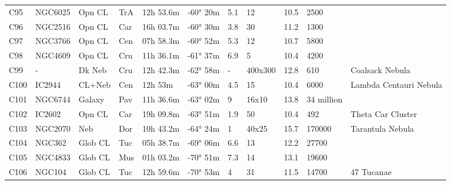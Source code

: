 \begin{table}[h]
\begin{tabular}{@{}lllllllllll@{}}
C95        & NGC6025     & Opn CL     & TrA       & 12h 53.6m & -60° 20m  & 5.1       & 12                   & 10.5     & 2500                &                                 \\
C96        & NGC2516     & Opn CL     & Car       & 16h 03.7m & -60° 30m  & 3.8       & 30                   & 11.2     & 1300                &                                 \\
C97        & NGC3766     & Opn CL     & Cen       & 07h 58.3m & -60° 52m  & 5.3       & 12                   & 10.7     & 5800                &                                 \\
C98        & NGC4609     & Opn CL     & Cru       & 11h 36.1m & -61° 37m  & 6.9       & 5                    & 10.4     & 4200                &                                 \\
C99        & -           & Dk Neb     & Cru       & 12h 42.3m & -62° 58m  & -         & 400x300              & 12.8     & 610                 & Coalsack Nebula                 \\
C100       & IC2944      & CL+Neb     & Cen       & 12h 53m   & -63° 00m  & 4.5       & 15                   & 10.4     & 6000                & Lambda Centauri Nebula          \\
C101       & NGC6744     & Galaxy     & Pav       & 11h 36.6m & -63° 02m  & 9         & 16x10                & 13.8     & 34 million          &                                 \\
C102       & IC2602      & Opn CL     & Car       & 19h 09.8m & -63° 51m  & 1.9       & 50                   & 10.4     & 492                 & Theta Car Cluster               \\
C103       & NGC2070     & Neb        & Dor       & 10h 43.2m & -64° 24m  & 1         & 40x25                & 15.7     & 170000              & Tarantula Nebula                \\
C104       & NGC362      & Glob CL    & Tuc       & 05h 38.7m & -69° 06m  & 6.6       & 13                   & 12.2     & 27700               &                                 \\
C105       & NGC4833     & Glob CL    & Mus       & 01h 03.2m & -70° 51m  & 7.3       & 14                   & 13.1     & 19600               &                                 \\
C106       & NGC104      & Glob CL    & Tuc       & 12h 59.6m & -70° 53m  & 4         & 31                   & 11.5     & 14700               & 47 Tucanae                      \\

\end{tabular}
\end{table}
